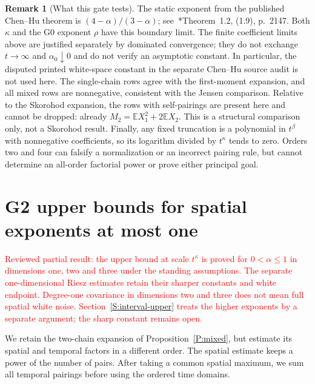 \documentclass[12pt]{article}
\numberwithin{equation}{section}
\theoremstyle{definition}
\newtheorem{remark}[theorem]{Remark}
\newcommand{\E}{\mathbb{E}}
\newcommand{\myCmts}[1]{\begin{framed}\noindent\textcolor{red}{#1}\end{framed}}
\begin{document}
\begin{remark}[What this gate tests]\label{R:G1-scope}
  The static exponent from the published Chen--Hu theorem is
  $(4-\alpha)/(3-\alpha)$; see~\cite{chen.hu:25:hyperbolic}*{Theorem~1.2,
  (1.9), p.~2147}. Both $\kappa$ and the G0 exponent $\rho$ have this
  boundary limit. The finite coefficient limits above are justified
  separately by dominated convergence; they do not exchange
  $t\to\infty$ and $\alpha_0\downarrow0$ and do not verify an
  asymptotic constant. In particular, the disputed printed white-space
  constant in the separate Chen--Hu source audit is not used here.
  The single-chain rows agree with the first-moment expansion, and all
  mixed rows are nonnegative, consistent with the Jensen comparison.
  Relative to the Skorohod expansion, the rows with self-pairings are present
  here and cannot be dropped: already $M_2=\E X_1^2+2\E X_2$.
  This is a structural comparison only, not a Skorohod result.
  Finally, any fixed truncation is a polynomial in $t^\beta$ with
  nonnegative coefficients, so its logarithm divided by $t^\kappa$
  tends to zero. Orders two and four can falsify a normalization or an
  incorrect pairing rule, but cannot determine an all-order factorial
  power or prove either principal goal.
\end{remark}

\section{G2 upper bounds for spatial exponents at most one}\label{S:d1-upper}

\myCmts{Reviewed partial result: the upper bound at scale $t^\kappa$
is proved for $0<\alpha\le1$ in dimensions one, two and three under
the standing assumptions. The separate one-dimensional Riesz
estimates retain their sharper constants and white endpoint.
Degree-one covariance in dimensions two and three does not mean
full spatial white noise. Section~\ref{S:interval-upper} treats the
higher exponents by a separate argument; the sharp constant remains open.}

We retain the two-chain expansion of Proposition~\ref{P:mixed}, but
estimate its spatial and temporal factors in a different order. The
spatial estimate keeps a power of the number of pairs. After taking a
common spatial maximum, we sum all temporal pairings before using the
ordered time domains.
\end{document}
